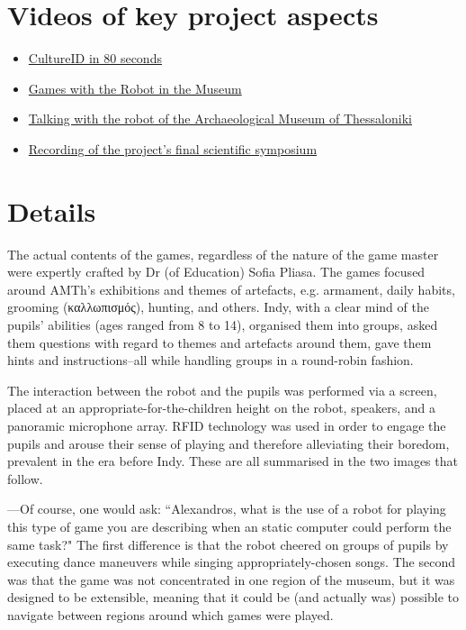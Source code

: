 \section{Videos of key project aspects}

\begin{itemize}
  \singlespacing
  \item \href{https://www.youtube.com/watch?v=SOA0To077WQ}{CultureID in 80 seconds}
  \item \href{https://www.youtube.com/watch?v=2EvTGNOqTrs}{Games with the Robot in the Museum}
  \item \href{https://www.youtube.com/watch?v=mrTL3Gep7Xk}{Talking with the robot of the Archaeological Museum of Thessaloniki}
  \item \href{https://www.youtube.com/watch?v=i5CUBswHWf0}{Recording of the project's final scientific symposium}
\end{itemize}


\section{Details}

The actual contents of the games, regardless of the nature of the game master
were expertly crafted by Dr (of Education) Sofia Pliasa. The games focused
around AMTh's exhibitions and themes of artefacts, e.g. armament, daily habits,
grooming (καλλωπισμός), hunting, and others. Indy, with a clear mind of the
pupils' abilities (ages ranged from 8 to 14), organised them into groups, asked
them questions with regard to themes and artefacts around them, gave them hints
and instructions--all while handling groups in a round-robin fashion.

The interaction between the robot and the pupils was performed via a screen,
placed at an appropriate-for-the-children height on the robot, speakers, and a
panoramic microphone array. RFID technology was used in order to engage the
pupils and arouse their sense of playing and therefore alleviating their
boredom, prevalent in the era before Indy. These are all summarised in the two
images that follow.

---Of course, one would ask: ``Alexandros, what is the use of a robot for
playing this type of game you are describing when an static computer could
perform the same task?" The first difference is that the robot cheered on
groups of pupils by executing dance maneuvers while singing
appropriately-chosen songs. The second was that the game was not concentrated
in one region of the museum, but it was designed to be extensible,
meaning that it could be (and actually was) possible to navigate between
regions around which games were played.


